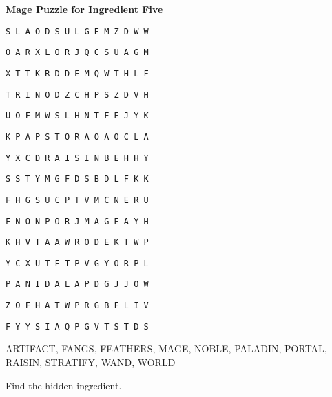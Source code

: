 \documentclass[white]{guildcamp3}
\begin{document}
\name{\wMagePuzzleFive{}} %

\large\textbf{Mage Puzzle for Ingredient Five}  

\texttt{S L A O D S U L G E M Z D W W }

\texttt{O A R X L O R J Q C S U A G M }

\texttt{X T T K R D D E M Q W T H L F }

\texttt{T R I N O D Z C H P S Z D V H }

\texttt{U O F M W S L H N T F E J Y K }

\texttt{K P A P S T O R A O A O C L A }

\texttt{Y X C D R A I S I N B E H H Y }

\texttt{S S T Y M G F D S B D L F K K }

\texttt{F H G S U C P T V M C N E R U }

\texttt{F N O N P O R J M A G E A Y H }

\texttt{K H V T A A W R O D E K T W P }

\texttt{Y C X U T F T P V G Y O R P L }

\texttt{P A N I D A L A P D G J J O W }

\texttt{Z O F H A T W P R G B F L I V }

\texttt{F Y Y S I A Q P G V T S T D S }

ARTIFACT, FANGS, FEATHERS, MAGE, NOBLE, PALADIN, PORTAL, RAISIN, STRATIFY, WAND, WORLD

Find the hidden ingredient.

\end{document}
